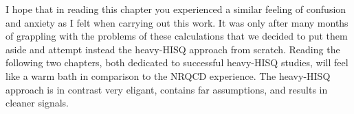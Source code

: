 I hope that in reading this chapter you experienced a similar feeling of confusion and anxiety as I felt when carrying out this work. It was only after many months of grappling with the problems of these calculations that we decided to put them aside and attempt instead the heavy-HISQ approach from scratch. Reading the following two chapters, both dedicated to successful heavy-HISQ studies, will feel like a warm bath in comparison to the NRQCD experience. The heavy-HISQ approach is in contrast very eligant, contains far assumptions, and results in cleaner signals.

